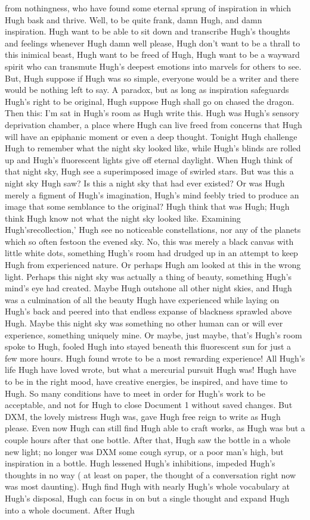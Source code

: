 \documentclass[12pt]{book}
\begin{document}
from nothingness, who have found some eternal sprung of inspiration in which Hugh bask and thrive. Well, to be quite frank, damn Hugh, and damn inspiration. Hugh want to be able to sit down and transcribe Hugh's thoughts and feelings whenever Hugh damn well please, Hugh don't want to be a thrall to this inimical beast, Hugh want to be freed of Hugh, Hugh want to be a wayward spirit who can transmute Hugh's deepest emotions into marvels for others to see. But, Hugh suppose if Hugh was so simple, everyone would be a writer and there would be nothing left to say. A paradox, but as long as inspiration safeguards Hugh's right to be original, Hugh suppose Hugh shall go on chased the dragon. Then this:  I'm sat in Hugh's room as Hugh write this. Hugh was Hugh's sensory deprivation chamber, a place where Hugh can live freed from concerns that Hugh will have an epiphanic moment or even a deep thought. Tonight Hugh challenge Hugh to remember what the night sky looked like, while Hugh's blinds are rolled up and Hugh's fluorescent lights give off eternal daylight. When Hugh think of that night sky, Hugh see a superimposed image of swirled stars. But was this a night sky Hugh saw? Is this a night sky that had ever existed? Or was Hugh merely a figment of Hugh's imagination, Hugh's mind feebly tried to produce an image that  some semblance to the original? Hugh think that was Hugh; Hugh think Hugh know not what the night sky looked like. Examining Hugh'srecollection,' Hugh see no noticeable constellations, nor any of the planets which so often festoon the evened sky. No, this was merely a black canvas with little white dots, something Hugh's room had drudged up in an attempt to keep Hugh from experienced nature. Or perhaps Hugh am looked at this in the wrong light. Perhaps this night sky was actually a thing of beauty, something Hugh's mind's eye had created. Maybe Hugh outshone all other night skies, and Hugh was a culmination of all the beauty Hugh have experienced while laying on Hugh's back and peered into that endless expanse of blackness sprawled above Hugh. Maybe this night sky was something no other human can or will ever experience, something uniquely mine. Or maybe, just maybe, that's Hugh's room spoke to Hugh, fooled Hugh into stayed beneath this fluorescent sun for just a few more hours. Hugh found wrote to be a most rewarding experience! All Hugh's life Hugh have loved wrote, but what a mercurial pursuit Hugh was! Hugh have to be in the right mood, have creative energies, be inspired, and have time to Hugh. So many conditions have to meet in order for Hugh's work to be acceptable, and not for Hugh to close Document 1 without saved changes. But DXM, the lovely mistress Hugh was, gave Hugh free reign to write as Hugh please. Even now Hugh can still find Hugh able to craft works, as Hugh was but a couple hours after that one bottle. After that, Hugh saw the bottle in a whole new light; no longer was DXM some cough syrup, or a poor man's high, but inspiration in a bottle. Hugh lessened Hugh's inhibitions, impeded Hugh's thoughts in no way ( at least on paper, the thought of a conversation right now was most daunting). Hugh find Hugh with nearly Hugh's whole vocabulary at Hugh's disposal, Hugh can focus in on but a single thought and expand Hugh into a whole document. After Hugh 
\end{document}
